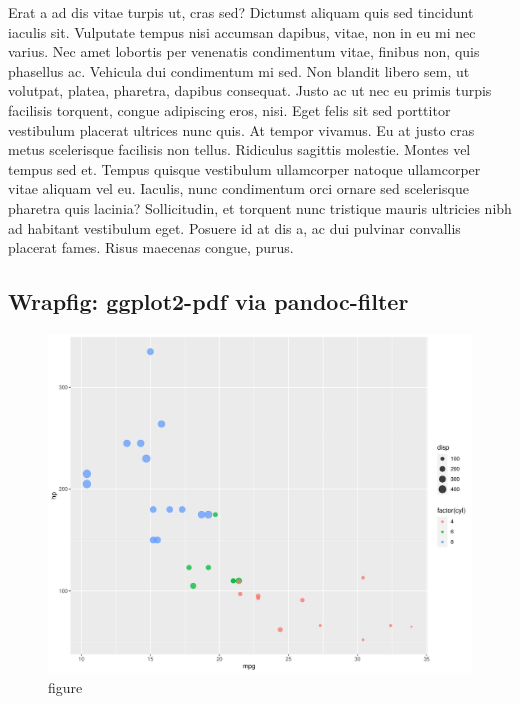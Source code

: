 \documentclass[
  9pt,
  letterpaper,
  DIV=11,
  numbers=noendperiod]{scrartcl}
\begin{document}
Erat a ad dis vitae turpis ut, cras sed? Dictumst aliquam quis sed
tincidunt iaculis sit. Vulputate tempus nisi accumsan dapibus, vitae,
non in eu mi nec varius. Nec amet lobortis per venenatis condimentum
vitae, finibus non, quis phasellus ac. Vehicula dui condimentum mi sed.
Non blandit libero sem, ut volutpat, platea, pharetra, dapibus
consequat. Justo ac ut nec eu primis turpis facilisis torquent, congue
adipiscing eros, nisi. Eget felis sit sed porttitor vestibulum placerat
ultrices nunc quis. At tempor vivamus. Eu at justo cras metus
scelerisque facilisis non tellus. Ridiculus sagittis molestie. Montes
vel tempus sed et. Tempus quisque vestibulum ullamcorper natoque
ullamcorper vitae aliquam vel eu. Iaculis, nunc condimentum orci ornare
sed scelerisque pharetra quis lacinia? Sollicitudin, et torquent nunc
tristique mauris ultricies nibh ad habitant vestibulum eget. Posuere id
at dis a, ac dui pulvinar convallis placerat fames. Risus maecenas
congue, purus.

\newpage{}

\hypertarget{wrapfig-ggplot2-pdf-via-pandoc-filter}{%
\subsection{Wrapfig: ggplot2-pdf via
pandoc-filter}\label{wrapfig-ggplot2-pdf-via-pandoc-filter}}

\begin{figure}\centering\includegraphics{mtcars.pdf}\caption{\label{fig-mtcars-wrapfig-1.5}
figure}\end{figure}
\end{document}
